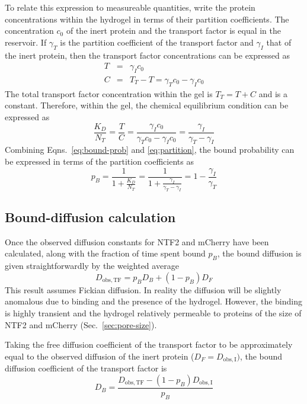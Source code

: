 To relate this expression to measureable quantities, write the protein concentrations within the hydrogel in terms of their partition coefficients. The concentration $c_0$ of the inert protein and the transport factor is equal in the reservoir.  If $\gamma_T$ is the partition coefficient of the transport factor and $\gamma_I$ that of the inert protein, then the transport factor concentrations can be expressed as
\begin{eqnarray}
T &=& \gamma_I c_0\\
C & =& T_T - T = \gamma_Tc_0 - \gamma_I c_0
\label{eq:gamma}
\end{eqnarray} 
The total transport factor concentration within the gel is $T_T = T + C$ and is a constant.
Therefore, within the gel, the chemical equilibrium condition can be expressed as
\begin{equation}
\frac{K_D}{N_T} = \frac{T}{C} = \frac{\gamma_I c_0}{\gamma_T c_0 - \gamma_I c_0} = \frac{\gamma_I}{\gamma_T - \gamma_I}
\label{eq:partition}
\end{equation}
Combining Eqns.~\ref{eq:bound-prob} and \ref{eq:partition}, the bound probability can be expressed in terms of the partition coefficients as
\begin{equation}
p_B= \frac{1}{1+\frac{K_D}{N_T}} = \frac{1}{1+\frac{\gamma_I}{\gamma_T - \gamma_I}} = 1 - \frac{\gamma_I}{\gamma_T}
\label{eq:bound-prob-final}
\end{equation}

\subsection{Bound-diffusion calculation}
\label{sec:db-calc}

Once the observed diffusion constants for NTF2 and mCherry have been calculated, along with the fraction of time spent bound $p_B$, the bound diffusion is given straightforwardly by the weighted average
\begin{equation}
D_\mathrm{obs, TF} = p_B D_B + (1-p_B) D_F
\label{eq:weighted-average}
\end{equation}
This result assumes Fickian diffusion.  In reality the diffusion will be slightly anomalous due to binding and the presence of the hydrogel.  However, the binding is highly transient and the hydrogel relatively permeable to proteins of the size of NTF2 and mCherry (Sec.~\ref{sec:pore-size}).

Taking the free diffusion coefficient of the transport factor to be approximately equal to the observed diffusion of the inert protein ($D_F = D_\mathrm{obs,I})$, the bound diffusion coefficient of the transport factor is
\begin{equation}
D_B = \frac{D_\mathrm{obs, TF}-(1-p_B) D_\mathrm{obs,I}}{p_B}
\label{eq:d-bound}
\end{equation}

